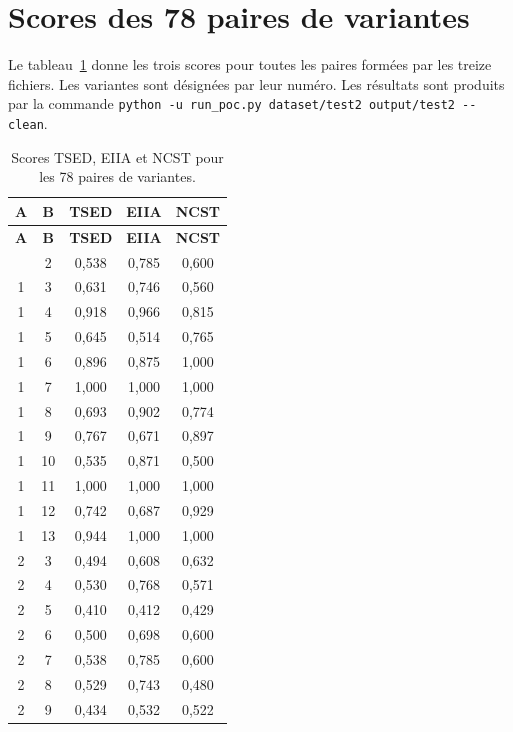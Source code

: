 \documentclass[12pt,a4paper,oneside]{report}
\begin{document}
\section{Scores des 78 paires de variantes}
\label{ann:paires}

Le tableau~\ref{tab:paires_completes} donne les trois scores pour toutes les
paires formées par les treize fichiers. Les variantes sont désignées par leur
numéro. Les résultats sont produits par la commande
\texttt{python -u run\_poc.py dataset/test2 output/test2 -{}-clean}.

\begingroup
\small
\begin{longtable}{ccccc}
\caption{Scores TSED, EIIA et NCST pour les 78 paires de variantes.}
\label{tab:paires_completes}\\
\toprule
\textbf{A} & \textbf{B} & \textcolor{tsedcol}{\textbf{TSED}} &
\textcolor{eiiacol}{\textbf{EIIA}} & \textcolor{ncstcol}{\textbf{NCST}} \\
\midrule
\endfirsthead
\toprule
\textbf{A} & \textbf{B} & \textcolor{tsedcol}{\textbf{TSED}} &
\textcolor{eiiacol}{\textbf{EIIA}} & \textcolor{ncstcol}{\textbf{NCST}} \\
\midrule
\endhead
\bottomrule
\endfoot
1 & 2 & 0,538 & 0,785 & 0,600 \\
1 & 3 & 0,631 & 0,746 & 0,560 \\
1 & 4 & 0,918 & 0,966 & 0,815 \\
1 & 5 & 0,645 & 0,514 & 0,765 \\
1 & 6 & 0,896 & 0,875 & 1,000 \\
1 & 7 & 1,000 & 1,000 & 1,000 \\
1 & 8 & 0,693 & 0,902 & 0,774 \\
1 & 9 & 0,767 & 0,671 & 0,897 \\
1 & 10 & 0,535 & 0,871 & 0,500 \\
1 & 11 & 1,000 & 1,000 & 1,000 \\
1 & 12 & 0,742 & 0,687 & 0,929 \\
1 & 13 & 0,944 & 1,000 & 1,000 \\
2 & 3 & 0,494 & 0,608 & 0,632 \\
2 & 4 & 0,530 & 0,768 & 0,571 \\
2 & 5 & 0,410 & 0,412 & 0,429 \\
2 & 6 & 0,500 & 0,698 & 0,600 \\
2 & 7 & 0,538 & 0,785 & 0,600 \\
2 & 8 & 0,529 & 0,743 & 0,480 \\
2 & 9 & 0,434 & 0,532 & 0,522 \\

\end{longtable}
\end{document}
